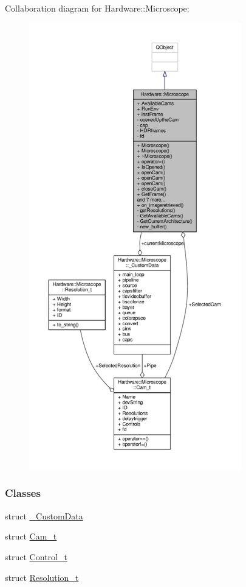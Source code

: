 Collaboration diagram for Hardware\+:\+:Microscope\+:
\nopagebreak
\begin{figure}[H]
\begin{center}
\leavevmode
\includegraphics[height=550pt]{class_hardware_1_1_microscope__coll__graph}
\end{center}
\end{figure}
\subsubsection*{Classes}
\begin{DoxyCompactItemize}
\item 
struct \hyperlink{struct_hardware_1_1_microscope_1_1___custom_data}{\+\_\+\+Custom\+Data}
\item 
struct \hyperlink{struct_hardware_1_1_microscope_1_1_cam__t}{Cam\+\_\+t}
\item 
struct \hyperlink{struct_hardware_1_1_microscope_1_1_control__t}{Control\+\_\+t}
\item 
struct \hyperlink{struct_hardware_1_1_microscope_1_1_resolution__t}{Resolution\+\_\+t}
\end{DoxyCompactItemize}
